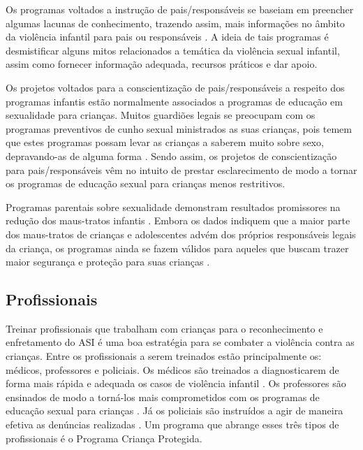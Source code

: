 Os programas voltados a instrução de pais/responsáveis se baseiam em preencher algumas lacunas de conhecimento, trazendo assim, mais informações no âmbito da violência infantil para pais ou responsáveis \cite{maria2010papel}. A ideia de tais programas é desmistificar alguns mitos relacionados a temática da violência sexual infantil, assim como fornecer informação adequada, recursos práticos e dar apoio.

Os projetos voltados para a conscientização de pais/responsáveis a respeito dos programas infantis estão normalmente associados a programas de educação em sexualidade para crianças. Muitos guardiões legais se preocupam com os programas preventivos de cunho sexual ministrados as suas crianças, pois temem que estes programas possam levar as crianças a saberem muito sobre sexo, depravando-as de alguma forma \cite{chen2007prevention}. Sendo assim, os projetos de conscientização para pais/responsáveis vêm no intuito de prestar esclarecimento de modo a tornar os programas de educação sexual para crianças menos restritivos. 

Programas parentais sobre sexualidade demonstram resultados promissores na redução dos maus-tratos infantis \cite{silverman2008evidence}. Embora os dados indiquem que a maior parte dos maus-tratos de crianças e adolescentes advém dos próprios responsáveis legais da criança, os programas ainda se fazem válidos para aqueles que buscam trazer maior segurança e proteção para suas crianças \cite{pelisoli2010prevenccao}.

\subsection{Profissionais}\label{ssec:professores}

Treinar profissionais que trabalham com crianças para o reconhecimento e enfretamento do \ac{ASI} é uma boa estratégia para se combater a violência contra as crianças. Entre os profissionais a serem treinados estão principalmente os: médicos, professores e policiais. Os médicos são treinados a diagnosticarem de forma mais rápida e adequada os casos de violência infantil \cite{paiva2012violencia}. Os professores são ensinados de modo a torná-los mais comprometidos com os programas de educação sexual para crianças \cite{colleen2016advancing}. Já os policiais são instruídos a agir de maneira efetiva as denúncias realizadas \cite{pelisoli2010prevenccao}. 
Um programa que abrange esses três tipos de profissionais é o Programa Criança Protegida. 

